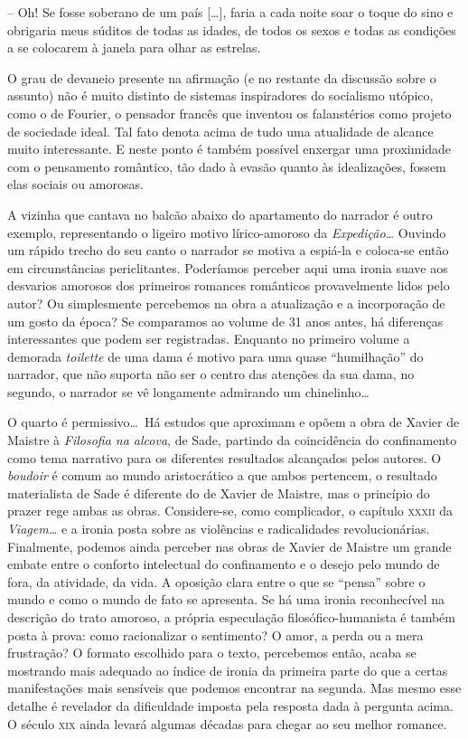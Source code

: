 \begin{hedraquote}
-- Oh! Se fosse soberano de um país [\ldots], faria a cada noite
soar o toque do sino e obrigaria meus súditos de todas as idades, de
todos os sexos e todas as condições a se colocarem à janela para olhar
as estrelas.
\end{hedraquote}

O grau de devaneio presente na afirmação (e no restante da discussão
sobre o assunto) não é muito distinto de sistemas inspiradores do
socialismo utópico, como o de Fourier, o pensador francês que inventou
os falanstérios como projeto de sociedade ideal. Tal fato denota acima
de tudo uma atualidade de alcance muito interessante. E neste ponto é
também possível enxergar uma proximidade com o pensamento romântico,
tão dado à evasão quanto às idealizações, fossem elas sociais ou
amorosas.

 A vizinha que cantava no balcão abaixo do apartamento do narrador é
outro exemplo, representando o ligeiro motivo lírico-amoroso da
\textit{Expedição\ldots} Ouvindo um rápido trecho do seu canto o narrador
se motiva a espiá-la e coloca-se então em circunstâncias periclitantes.
Poderíamos perceber aqui uma ironia suave aos desvarios amorosos dos
primeiros romances românticos provavelmente lidos pelo autor? Ou
simplesmente percebemos na obra a atualização e a incorporação de um
gosto da época? Se comparamos ao volume de 31 anos antes, há diferenças
interessantes que podem ser registradas. Enquanto no primeiro volume a
demorada \textit{toilette} de uma dama é motivo para uma quase
``humilhação'' do narrador, que não suporta não ser o centro das atenções
da sua dama, no segundo, o narrador se vê longamente admirando um
chinelinho\ldots 

O quarto é permissivo\ldots\  Há estudos que aproximam e opõem a obra de
Xavier de Maistre à \textit{Filosofia na alcova}, de Sade, partindo da
coincidência do confinamento como tema narrativo para os diferentes
resultados alcançados pelos autores. O \textit{boudoir} é comum ao
mundo aristocrático a que ambos pertencem, o resultado materialista de
Sade é diferente do de Xavier de Maistre, mas o princípio do prazer
rege ambas as obras. Considere-se, como complicador, o capítulo \textsc{xxxii}
da \textit{Viagem\ldots} e a ironia posta sobre as violências e
radicalidades revolucionárias. Finalmente, podemos ainda perceber nas
obras de Xavier de Maistre um grande embate entre o conforto
intelectual do confinamento e o desejo pelo mundo de fora, da
atividade, da vida. A oposição clara entre o que se ``pensa'' sobre o
mundo e como o mundo de fato se apresenta. Se há uma ironia
reconhecível na descrição do trato amoroso, a própria especulação
filosófico-humanista é também posta à prova: como racionalizar o
sentimento? O amor, a perda ou a mera frustração? O formato escolhido
para o texto, percebemos então, acaba se mostrando mais adequado ao
índice de ironia da primeira parte do que a certas manifestações mais
sensíveis que podemos encontrar na segunda. Mas mesmo esse detalhe é
revelador da dificuldade imposta pela resposta dada à pergunta acima. O
século \textsc{xix} ainda levará algumas décadas para chegar ao seu melhor
romance.

